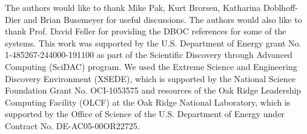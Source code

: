 The authors would like to thank Mike Pak, Kurt Brorsen, Katharina Doblhoff-Dier and Brian Busemeyer for useful discussions. The authors would also like to thank Prof. David Feller for providing the DBOC references for some of the systems. This work was supported by the U.S. Department of Energy grant No. 1-485267-244000-191100 as part of the Scientific Discovery through Advanced Computing (SciDAC) program. We used the Extreme Science and Engineering Discovery Environment (XSEDE), which is supported by the National Science Foundation Grant No. OCI-1053575 and resources of the Oak Ridge Leadership Computing Facility (OLCF) at the Oak Ridge National Laboratory, which is supported by the Office of Science of the U.S. Department of Energy under Contract No. DE-AC05-00OR22725.
